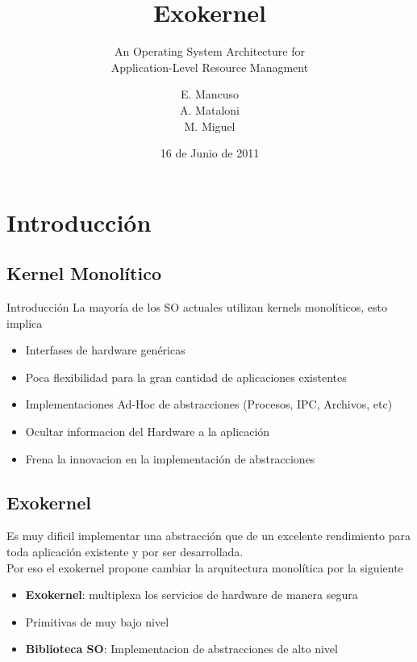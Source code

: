 \documentclass[10pt]{beamer}
\title{Exokernel}
\subtitle{An Operating System Architecture for \\  Application-Level Resource Managment}
\author{E. Mancuso\\ A. Mataloni\\ M. Miguel }
\date{16 de Junio de 2011}
\begin{document}
 \begin{frame}
  \titlepage
 \end{frame}
 \begin{frame}
  \tableofcontents
 \end{frame}
\section{Introducción}
\subsection{Kernel Monolítico}
\begin{frame}{Introducción}
La mayoría de los SO actuales utilizan kernels monolíticos, esto implica

\begin{itemize}
  \item Interfases de hardware genéricas
  \item Poca flexibilidad para la gran cantidad de aplicaciones existentes
  \item Implementaciones Ad-Hoc de abstracciones (Procesos, IPC, Archivos, etc)
  \item Ocultar informacion del Hardware a la aplicación
  \item Frena la innovacion en la implementación de abstracciones
\end{itemize}
\end{frame}

\subsection{Exokernel}
\begin{frame}

Es muy dificil implementar una abstracción que de un excelente rendimiento para toda aplicación existente y por ser desarrollada.\\[1em]

Por eso el exokernel propone cambiar la arquitectura monolítica por la siguiente \\[1em]

\begin{itemize}
  \item \textbf{Exokernel}: multiplexa los servicios de hardware de manera segura
  \item Primitivas de muy bajo nivel
  \item \textbf{Biblioteca SO}: Implementacion de abstracciones de alto nivel
\end{itemize}
\end{frame}
\end{document}
